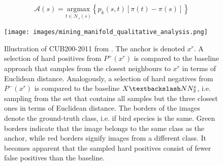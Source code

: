 \begin{equation}
    \mathcal{A}(s) = \underset{t \in \mathcal{N_\varepsilon}(s)}{\text{argmax}} \left\{ p_k(s,t)\left[ \pi(t)-\pi(s) \right] \right\}
    \label{eq:authority_ascent_shift}
\end{equation}



\begin{figure}[!htb] %
    \centering
    \texttt{[image: images/mining\_manifold\_qualitative\_analysis.png]}
    \caption{Illustration of CUB200-2011 from \citet{mining_manifolds_2018}.
    The anchor is denoted $x^r$.
    A selection of hard positives from $P^+(x^r)$ is compared to the 
    baseline approach that samples from the closest neighbours to $x^r$ in 
    terms of Euclidean distance.
    Analogously, a selection of hard negatives from $P^-(x^r)$ 
    is compared to the baseline $X \textbackslash NN^e_3$, 
    i.e. sampling from the set that contains all samples but the three closest ones in 
    terms of Euclidean distance.
    The borders of the images denote the ground-truth class, i.e. if bird species is the same.
    Green borders indicate that the image belongs to the same class as the anchor, 
    while red borders signify images from a different class.
    It becomes apparent that the sampled hard positives consist of fewer false positives 
    than the baseline.
    }
    \label{fig:manifold_mining_qualitative_analysis}
\end{figure}

